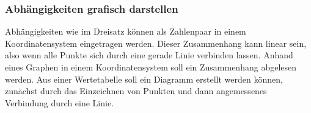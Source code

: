 \documentclass{article}
\begin{document}
\subsubsection*{Abhängigkeiten grafisch darstellen}
Abhängigkeiten wie im Dreisatz können als Zahlenpaar in einem Koordinatensystem eingetragen werden. Dieser Zusammenhang kann linear sein, also wenn alle Punkte sich durch eine gerade Linie verbinden lassen.
Anhand eines Graphen in einem Koordinatensystem soll ein Zusammenhang abgelesen werden. Aus einer Wertetabelle soll ein Diagramm erstellt werden können, zunächst durch das Einzeichnen von Punkten und dann angemessenes Verbindung durch eine Linie. 
\end{document}
